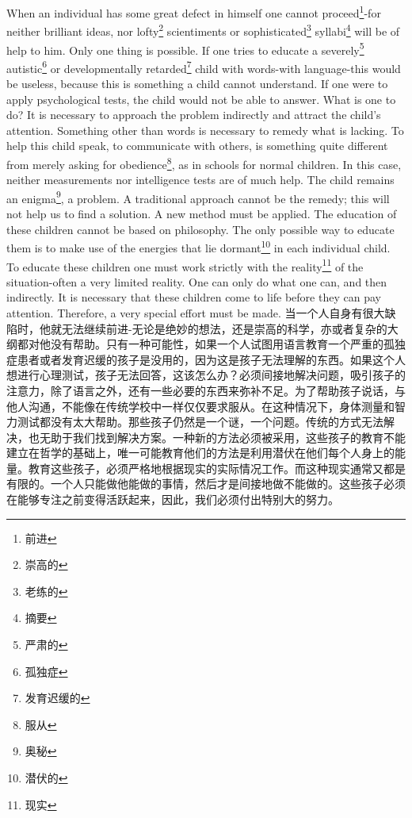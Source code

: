 \documentclass[lang=cn,10pt]{elegantbook}
\begin{document}
When an individual has some great defect in himself one cannot proceed\footnote{前进}-for neither brilliant ideas, nor lofty\footnote{崇高的} scientiments or sophisticated\footnote{老练的} syllabi\footnote{摘要} will be of help to him. Only one thing is possible. If one tries to educate a severely\footnote{严肃的} autistic\footnote{孤独症} or developmentally retarded\footnote{发育迟缓的} child with words-with language-this would be useless, because this is something a child cannot understand. If one were to apply psychological tests, the child would not be able to answer. What is one to do? It is necessary to approach the problem indirectly and attract the child's attention. Something other than words is necessary to remedy what is lacking. To help this child speak, to communicate with others, is something quite different from merely asking for obedience\footnote{服从}, as in schools for normal children. In this case, neither measurements nor intelligence tests are of much help. The child remains an enigma\footnote{奥秘}, a problem. A traditional approach cannot be the remedy; this will not help us to find a solution. A new method must be applied. The education of these children cannot be based on philosophy. The only possible way to educate them is to make use of the energies that lie dormant\footnote{潜伏的} in each individual child. To educate these children one must work strictly with the reality\footnote{现实} of the situation-often a very limited reality. One can only do what one can, and then indirectly. It is necessary that these children come to life before they can pay attention. Therefore, a very special effort must be made.  
当一个人自身有很大缺陷时，他就无法继续前进-无论是绝妙的想法，还是崇高的科学，亦或者复杂的大纲都对他没有帮助。只有一种可能性，如果一个人试图用语言教育一个严重的孤独症患者或者发育迟缓的孩子是没用的，因为这是孩子无法理解的东西。如果这个人想进行心理测试，孩子无法回答，这该怎么办？必须间接地解决问题，吸引孩子的注意力，除了语言之外，还有一些必要的东西来弥补不足。为了帮助孩子说话，与他人沟通，不能像在传统学校中一样仅仅要求服从。在这种情况下，身体测量和智力测试都没有太大帮助。那些孩子仍然是一个谜，一个问题。传统的方式无法解决，也无助于我们找到解决方案。一种新的方法必须被采用，这些孩子的教育不能建立在哲学的基础上，唯一可能教育他们的方法是利用潜伏在他们每个人身上的能量。教育这些孩子，必须严格地根据现实的实际情况工作。而这种现实通常又都是有限的。一个人只能做他能做的事情，然后才是间接地做不能做的。这些孩子必须在能够专注之前变得活跃起来，因此，我们必须付出特别大的努力。
\end{document}
